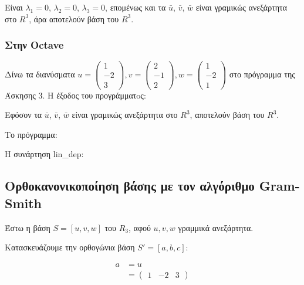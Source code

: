 \documentclass[12pt, fleqn, leqno]{extreport}
\begin{document}
Είναι $\lambda_{1}=0$, $\lambda_{2}=0$, $\lambda_{3}=0$, επομένως και τα $\bar{u}$, $\bar{v}$, $\bar{w}$ είναι γραμικώς ανεξάρτητα στο $R^{3}$, άρα αποτελούν βάση του $R^{3}$.

\newpage
\subsubsection{Στην Octave}

Δίνω τα διανύσματα
$
    u = \begin{pmatrix}
        1 \\ -2 \\ 3
    \end{pmatrix},
    v = \begin{pmatrix}
        2 \\ -1 \\ 2
    \end{pmatrix},
    w = \begin{pmatrix}
        1 \\ -2 \\ 1
    \end{pmatrix}
$
στο πρόγραμμα της Άσκησης 3. Η έξοδος του προγράμματoς:

Εφόσον τα $\bar{u}$, $\bar{v}$, $\bar{w}$ είναι γραμικώς ανεξάρτητα στο $R^{3}$, αποτελούν βάση του $R^{3}$.

Το πρόγραμμα:

Η συνάρτηση lin\_dep:



\newpage
\subsection{Ορθοκανονικοποίηση βάσης με τον αλγόριθμο Gram-Smith}

Έστω η βάση $S=[u, v, w]$ του $R_{3}$, αφού $u, v, w$ γραμμικά ανεξάρτητα.

Κατασκευάζουμε την ορθογώνια βάση $S'=[a, b, c]$:

\begin{equation}
    \begin{split}
        a &= u
        \\&=
        \begin{pmatrix}
            1 & -2 & 3
        \end{pmatrix}
    \end{split}
\end{equation}
\end{document}
